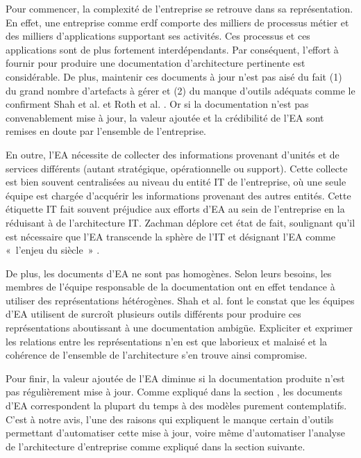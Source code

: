 	Pour commencer, la complexité de l'entreprise se retrouve dans sa 
représentation. En 
effet, une entreprise comme \gls{erdf} comporte des milliers de processus métier 
et des milliers d'applications supportant ses activités. Ces processus et ces 
applications sont de plus fortement interdépendants. Par conséquent, l'effort à 
fournir pour produire une documentation d'architecture pertinente est 
considérable. De plus, maintenir ces documents à jour n'est pas aisé du fait (1) 
du grand nombre d'artefacts à gérer et (2) du manque d'outils adéquats comme le 
confirment Shah et al. \cite{shah2007frameworks} et Roth et al. 
\cite{roth2013enterprise}. Or si la documentation n'est pas convenablement mise 
à jour, la valeur ajoutée et la crédibilité de l'EA sont remises en doute par 
l'ensemble de l'entreprise. 
	
	En outre, l'EA nécessite de collecter des informations provenant d'unités et de 
services différents (autant stratégique, opérationnelle ou support). Cette 
collecte est bien souvent centralisées au niveau du entité IT de l'entreprise, 
où une seule équipe est chargée d'acquérir les informations provenant des autres 
entités. Cette étiquette IT fait souvent préjudice aux efforts d'EA au sein de 
l'entreprise en la réduisant à de l'architecture IT. Zachman déplore cet état de 
fait, soulignant qu'il est nécessaire que l'EA transcende la sphère de l'IT et 
désignant l'EA comme «~l'enjeu du siècle~» \cite{zachman1997enterprise}.
	
	De plus, les documents d'EA ne sont pas homogènes. Selon leurs besoins, les 
membres de l'équipe responsable de la documentation ont en effet tendance à 
utiliser des représentations hétérogènes. Shah et al. \cite{shah2007frameworks} 
font le constat que les équipes d'EA utilisent de surcroît plusieurs outils 
différents pour produire ces représentations aboutissant à une documentation 
ambigüe. Expliciter et exprimer les relations entre les représentations n'en est 
que laborieux et malaisé et la cohérence de l'ensemble de l'architecture s'en 
trouve ainsi compromise.
	
	Pour finir, la valeur ajoutée de l'EA diminue si la documentation produite 
n'est pas 
régulièrement mise à jour. Comme expliqué dans la section , les documents d'EA 
correspondent la plupart du temps à des modèles purement contemplatifs. C'est à 
notre avis, l'une des raisons qui expliquent le manque certain d'outils 
permettant d'automatiser cette mise à jour, voire même d'automatiser l'analyse 
de l'architecture d'entreprise comme expliqué dans la section suivante.
	

